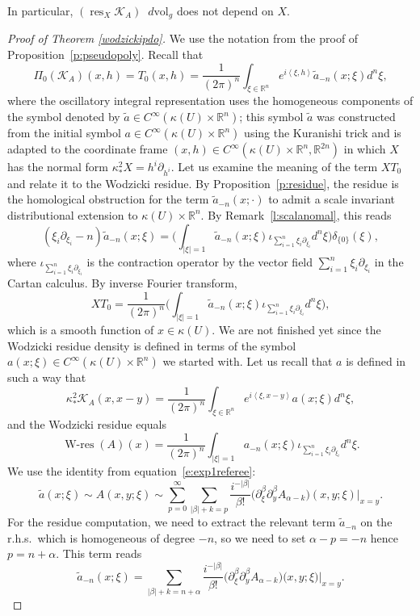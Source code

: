 \documentclass[10pt]{amsart}
\let\pazocal\mathscr
\theoremstyle{definition}
\newenvironment{refproof}[1]{\begin{proof}[Proof of {#1}]}{\end{proof}}
\let\cv\alpha
\let\asigma a
\let\euler X
\DeclareMathOperator{\wres}{{\scriptstyle W}-res}
\DeclareMathOperator{\resnorm}{res}
\newcommand{\resdyn}{{\resnorm_\euler}}
\newcommand\dvol{\mathop{}\!d\mathrm{vol}}
\begin{document}
In particular, $ (\resdyn {\pazocal{K}_{A}}) \dvol_g$ {does not depend} on $\euler$.

\begin{refproof}{Theorem \ref{wodzickipdo}}
We use the notation from the proof of Proposition~\ref{p:pseudopoly}.
Recall that
\[
\Pi_0({\pazocal{K}_{A}})(x,h)=T_0(x,h)=\frac{1}{(2\pi)^n} \int_{\xi\in \mathbb{R}^n} e^{i\left\langle \xi,h\right\rangle}\tilde{\asigma}_{-n}(x;\xi)d^n\xi,
\]
where the oscillatory integral representation uses the homogeneous components of the symbol denoted by $\tilde{\asigma} \in C^\infty(\kappa(U)\times \mathbb{R}^n)$; this
symbol $\tilde{\asigma}$ was constructed from the initial symbol $\asigma\in C^\infty(\kappa(U)\times \mathbb{R}^n)$ using the Kuranishi trick and
is adapted to the coordinate frame $(x,h)\in C^\infty(\kappa(U)\times \mathbb{R}^n, \mathbb{R}^{2n})$
in which $\euler$ has the normal form $\kappa^2_*\euler=h^i\partial_{h^i}$.
Let us examine the meaning of the term $\euler T_0$ and
relate it to the Wodzicki residue.
By Proposition~\ref{p:residue},
the residue is the homological obstruction for the term
$\tilde{\asigma}_{-n}(x;\cdot) $ to admit a scale invariant distributional extension to $\kappa(U)\times \mathbb{R}^n$.
By Remark~\ref{l:scalanomal},
this reads
\[
(\xi_i\partial_{\xi_i}-n) \tilde{\asigma}_{-n}(x;\xi)= \biggl(\int_{\vert \xi\vert=1}\tilde{\asigma}_{-n}(x;\xi) \iota_{\sum_{i=1}^n\xi_i\partial_{\xi_i}} d^n\xi \biggr)\delta_{\{0\}}(\xi),
\]
where $\iota_{\sum_{i=1}^n\xi_i\partial_{\xi_i}}$ is the contraction operator by the vector field $\sum_{i=1}^n\xi_i\partial_{\xi_i}$ in the Cartan calculus.
By inverse Fourier transform,
\[
\euler T_0=\frac{1}{(2\pi)^n} \biggl(\int_{\vert \xi\vert=1}\tilde{\asigma}_{-n}(x;\xi)\iota_{\sum_{i=1}^n\xi_i\partial_{\xi_i}} d^n\xi\biggr),
\]
which is a smooth function of $x\in \kappa(U)$.
We are not finished yet since the Wodzicki residue density is defined in terms of the
symbol $\asigma(x;\xi) \in C^\infty(\kappa(U)\times \mathbb{R}^n)$ we started with. Let us recall that $\asigma$ is defined in
such a way that
\[
\kappa^2_*{\pazocal{K}_A}(x,x-y)=\frac{1}{(2\pi)^n} \int_{\xi\in \mathbb{R}^n} e^{i\left\langle \xi,x-y\right\rangle}\asigma(x;\xi)d^n\xi,
\]
and the Wodzicki residue equals
\[
\wres(A)(x)=\frac{1}{(2\pi)^n} \int_{\vert \xi \vert=1}\asigma_{-n}(x;\xi) \iota_{\sum_{i=1}^n\xi_i\partial_{\xi_i}} d^n\xi.
\]
We use the identity from equation~\eqref{e:exp1referee}:
\[
\tilde{a}(x;\xi)\sim A(x,y;\xi)\sim \sum_{p=0}^\infty \sum_{\vert \beta\vert+k=p} \frac{i^{-\vert\beta\vert}}{\beta !} \bigl(\partial_\xi^\beta\partial_y^\beta A_{\alpha-k}\bigr)(x,y;\xi)|_{x=y}.
\]
For the residue computation, we need to extract the relevant term $\tilde{a}_{-n}$ on the r.h.s.~which is homogeneous of degree $-n$, so we need to set $\cv-p=-n$ hence $p=n+\cv $. This term reads
\[
\tilde{a}_{-n}(x;\xi)=\sum_{\vert \beta\vert+k=n+\cv} \frac{i^{-\vert\beta\vert}}{\beta !}\bigl(\partial_\xi^\beta\partial_y^\beta A_{\cv-k})(x,y;\xi\bigl)|_{x=y}.
\]


\end{refproof}
\end{document}
